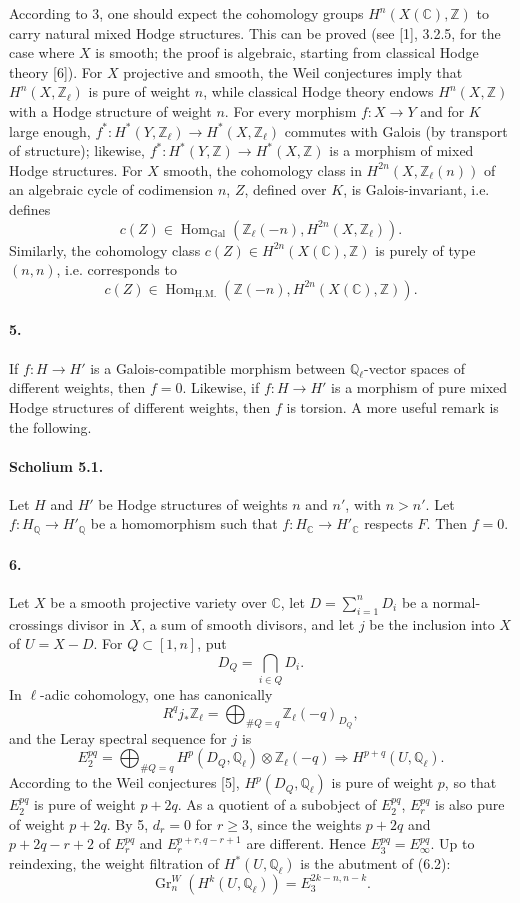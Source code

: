 \documentclass[10pt]{article}
\newcommand{\C}{\mathbb C}
\newcommand{\Q}{\mathbb Q}
\newcommand{\Z}{\mathbb Z}
\newcommand{\Ql}{\mathbb Q_\ell}
\newcommand{\Zl}{\mathbb Z_\ell}
\newcommand{\Gr}{\operatorname{Gr}}
\newcommand{\Gal}{\operatorname{Gal}}
\newcommand{\Hom}{\operatorname{Hom}}
\begin{document}
According to 3, one should expect the cohomology groups $H^n(X(\C),\Z)$ to carry natural mixed Hodge structures. This can be proved (see [1], 3.2.5, for the case where $X$ is smooth; the proof is algebraic, starting from classical Hodge theory [6]). For $X$ projective and smooth, the Weil conjectures imply that $H^n(X,\Zl)$ is pure of weight $n$, while classical Hodge theory endows $H^n(X,\Z)$ with a Hodge structure of weight $n$. For every morphism $f:X\to Y$ and for $K$ large enough, $f^*:H^*(Y,\Zl)\to H^*(X,\Zl)$ commutes with Galois (by transport of structure); likewise, $f^*:H^*(Y,\Z)\to H^*(X,\Z)$ is a morphism of mixed Hodge structures. For $X$ smooth, the cohomology class in $H^{2n}(X,\Zl(n))$ of an algebraic cycle of codimension $n$, $Z$, defined over $K$, is Galois-invariant, i.e. defines
\[
c(Z)\in\Hom_{\Gal}(\Zl(-n),H^{2n}(X,\Zl)).
\]
Similarly, the cohomology class $c(Z)\in H^{2n}(X(\C),\Z)$ is purely of type $(n,n)$, i.e. corresponds to
\[
c(Z)\in\Hom_{\mathrm{H.M.}}(\Z(-n),H^{2n}(X(\C),\Z)).
\]

\paragraph{5.} If $f:H\to H'$ is a Galois-compatible morphism between $\Ql$-vector spaces of different weights, then $f=0$. Likewise, if $f:H\to H'$ is a morphism of pure mixed Hodge structures of different weights, then $f$ is torsion. A more useful remark is the following.

\paragraph{Scholium 5.1.} Let $H$ and $H'$ be Hodge structures of weights $n$ and $n'$, with $n>n'$. Let $f:H_\Q\to H'_\Q$ be a homomorphism such that $f:H_\C\to H'_\C$ respects $F$. Then $f=0$.

\paragraph{6.} Let $X$ be a smooth projective variety over $\C$, let $D=\sum_{i=1}^nD_i$ be a normal-crossings divisor in $X$, a sum of smooth divisors, and let $j$ be the inclusion into $X$ of $U=X-D$. For $Q\subset[1,n]$, put
\[
D_Q=\bigcap_{i\in Q}D_i.
\]
In $\ell$-adic cohomology, one has canonically
\[
\tag{6.1}
R^qj_*\Zl=\bigoplus_{\#Q=q}\Zl(-q)_{D_Q},
\]
and the Leray spectral sequence for $j$ is
\[
\tag{6.2}
E_2^{pq}=\bigoplus_{\#Q=q}H^p(D_Q,\Ql)\otimes\Zl(-q)\Rightarrow H^{p+q}(U,\Ql).
\]
According to the Weil conjectures [5], $H^p(D_Q,\Ql)$ is pure of weight $p$, so that $E_2^{pq}$ is pure of weight $p+2q$. As a quotient of a subobject of $E_2^{pq}$, $E_r^{pq}$ is also pure of weight $p+2q$. By 5, $d_r=0$ for $r\ge3$, since the weights $p+2q$ and $p+2q-r+2$ of $E_r^{pq}$ and $E_r^{p+r,q-r+1}$ are different. Hence $E_3^{pq}=E_\infty^{pq}$. Up to reindexing, the weight filtration of $H^*(U,\Ql)$ is the abutment of (6.2):
\[
\tag{6.3}
\Gr_n^W(H^k(U,\Ql))=E_3^{2k-n,n-k}.
\]
\end{document}
